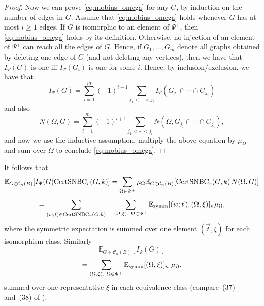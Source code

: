 \documentclass{memo-l}
\newcommand{\nonsigma}{\xi}
\theoremstyle{plain}
\theoremstyle{definition}
\numberwithin{section}{chapter}
\numberwithin{equation}{chapter}
\newcommand{\potwalk}{(w;\vec t\,)}
\theoremstyle{plain}
\theoremstyle{definition}
\newcommand\EE{\mathbb{E}}
\newcommand\cC{\mathcal{C}}
\begin{document}
\begin{proof}
Now we can prove \eqref{eq:mobius_omega} for any $G$, by induction
on the number of edges in $G$.
Assume that \eqref{eq:mobius_omega} holds whenever $G$ has at most
$i\ge 1$ edges.  If $G$ is isomorphic to an element of
$\Psi^+$, then \eqref{eq:mobius_omega} holds
by its definition.  Otherwise, no injection of an element of
$\Psi^+$ can reach all the edges of $G$.  Hence, if
$G_1,\ldots,G_m$ denote all graphs obtained by deleting one edge of
$G$ (and not deleting any vertices), then we have that
$I_\Psi(G)$ is one iff $I_\Psi(G_i)$ is one for some $i$.
Hence, by inclusion/exclusion, we have that
$$
I_\Psi(G) = \sum_{i=1}^m (-1)^{i+1} \sum_{j_1<\cdots<j_i}
I_\Psi(G_{j_1}\cap \cdots \cap G_{j_i})
$$
and also
$$
N(\Omega,G) = 
\sum_{i=1}^m (-1)^{i+1} \sum_{j_1<\cdots<j_i}
N(\Omega,G_{j_1}\cap \cdots \cap G_{j_i}),
$$
and now we use the inductive assumption, multiply the above equation
by $\mu_\Omega$ and sum over $\Omega$ to conclude
\eqref{eq:mobius_omega}.
\end{proof}

It follows that 
\[ \EE_{G\in\cC_n(B)}[I_{\Psi}(G) {\rm CertSNBC}_r(G,k) ] 
= \sum_{\Omega\in\Psi^+} \mu_\Omega 
\EE_{G\in\cC_n(B)}[{\rm CertSNBC}_r(G,k)\, N(\Omega,G) ] 
\]
\begin{equation}\label{eq:sumPsi1} = 
\sum_{(w,\vec t)\in {\rm CertSNBC}_r(G,k)} 
\ \ \   \sum_{(\Omega,\nonsigma),\ \Omega\in\Psi^+}
\EE_{\rm symm}[\potwalk,(\Omega,\nonsigma)]_n \mu_\Omega ,
\end{equation}
where the symmetric expectation is summed over one element
$(\vec t,\nonsigma)$ for each isomorphism class.
Similarly 
\[ \EE_{G\in\cC_n(B)}[I_{\Psi}(G)] \]
\begin{equation}\label{eq:sumPsi2} = \sum_{(\Omega,\nonsigma),\
\Omega\in\Psi^+} \EE_{\rm symm}[(\Omega,\nonsigma)]_n \; \mu_{\Omega} ,
\end{equation}
summed over one representative $\nonsigma$ in each
equivalence class (compare~(37) and~(38) of \cite{friedman_alon}).
\end{document}
